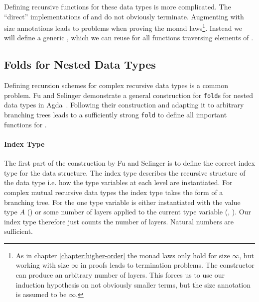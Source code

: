 Defining recursive functions for these data types is more complicated.
The ``direct'' implementations of  and \AgdaFunction{>>=}
do not obviously terminate.
Augmenting  with size annotations leads to problems when
proving the monad laws\footnote{As in chapter \ref{chapter:higher-order} the
  monad laws only hold for size $\infty$, but working with size $\infty$ in
  proofs leads to termination problems.
  The  constructor can produce an arbitrary number
  of \AgdaSpace{} layers.
  This forces us to use our induction hypothesis on not obviously smaller terms,
  but the size annotation is assumed to be $\infty$.}.
Instead we will define a generic , which we can reuse for all
functions traversing elements of
\AgdaSpace{}\AgdaSpace{}.


\subsection{Folds for Nested Data Types}
\label{scoped-algebra:fold}

Defining recursion schemes for complex recursive data types is a common problem.
Fu and Selinger demonstrate a general construction for \texttt{fold}s for nested
data types in Agda~\cite{DBLP:journals/corr/abs-1806-05230}.
Following their construction and adapting it to arbitrary branching trees leads
to a sufficiently strong \texttt{fold} to define all important functions for
\AgdaSpace{}\AgdaSpace{}.

\paragraph{Index Type} The first part of the construction by Fu and Selinger is
to define the correct index type for the data structure.
The index type describes the recursive structure of the data type i.e. how the
type variables at each level are instantiated.
For complex mutual recursive data types the index type takes the form of a
branching tree.
For \AgdaSpace{}
the one type variable is either instantiated with the value type $A$
() or some number of
\AgdaSpace{} layers applied to
the current type variable (,
).
Our index type therefore just counts the number of
\AgdaSpace{} layers.
Natural numbers are sufficient.

